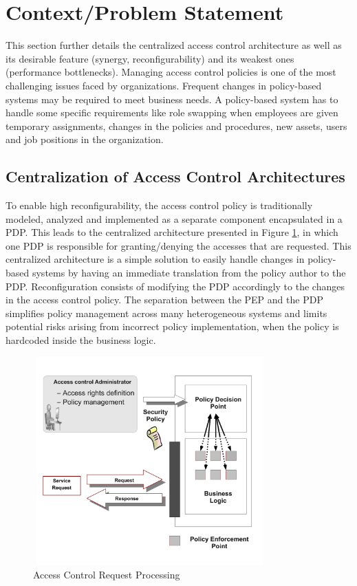 
\section{Context/Problem Statement} \label{sec:context}
This section further details the centralized access control architecture as well as its desirable feature (synergy, reconfigurability) and its weakest ones (performance bottlenecks). 
Managing access control policies is one of the most challenging issues faced by organizations. Frequent changes in policy-based systems may be required to meet business needs. 
A policy-based system has to handle some specific requirements like role swapping when employees are given temporary assignments, changes in the policies and procedures, 
new assets, users and job positions in the organization.

\subsection{Centralization of Access Control Architectures}
To enable high reconfigurability, the access control policy is traditionally modeled, analyzed and implemented as a separate component 
encapsulated in a PDP. This leads to the centralized architecture presented in Figure \ref{pep-pdp}, in which one PDP is responsible for granting/denying the accesses that are requested. 
This centralized architecture is a simple solution to easily handle changes in policy-based systems by having an immediate translation from the policy author to the PDP. Reconfiguration consists of modifying the PDP accordingly to 
the changes in the access control policy. The separation between the PEP and the PDP simplifies policy management across many heterogeneous systems and limits
potential risks arising from incorrect policy implementation, when the policy is hardcoded inside the business logic.

\begin{figure}[!h]
\begin{center}
\includegraphics[width=9cm, height=8cm]{business-logic}
\caption{Access Control Request Processing}
\label{pep-pdp}
\end{center}
\end{figure}

